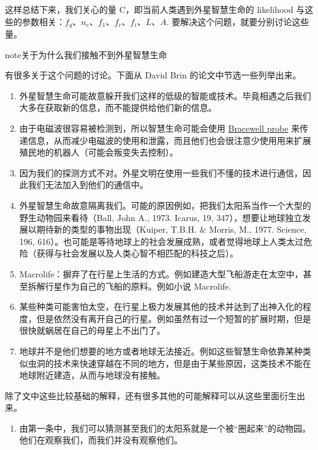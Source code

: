 \documentclass[letterpaper,10pt,english]{sphinxmanual}
\begin{document}
这样总结下来，我们关心的量 C，即当前人类遇到外星智慧生命的 likelihood 与这些的参数相关：\(f_g\)、\(n_e\)、\(f_1\)、\(f_c\)、\(f_i\)、\(L\)、\(A\). 要解决这个问题，就要分别讨论这些量。

\begin{notice}{note}{关于为什么我们接触不到外星智慧生命}

有很多关于这个问题的讨论。下面从 David Brin 的论文中节选一些列举出来。
\begin{enumerate}
\item {} 
外星智慧生命可能故意躲开我们这样的低级的智能或技术。毕竟相遇之后我们大多在获取新的信息，而不能提供给他们新的信息。

\item {} 
由于电磁波很容易被检测到，所以智慧生命可能会使用 \href{https://en.wikipedia.org/wiki/Bracewell\_probe}{Bracewell probe} 来传递信息，从而减少电磁波的使用和泄露，而且他们也会很注意少使用用来扩展殖民地的机器人（可能会叛变失去控制）。

\item {} 
因为我们的探测方式不对。外星文明在使用一些我们不懂的技术进行通信，因此我们无法加入到他们的通信中。

\item {} 
外星智慧生命故意隔离我们。可能的原因例如，把我们太阳系当作一个大型的野生动物园来看待（Ball, John A., 1973. Icarus, 19, 347），想要让地球独立发展以期待新的类型的事物出现（Kuiper, T.B.H. \& Morris, M., 1977. Science, 196, 616）。也可能是等待地球上的社会发展成熟，或者觉得地球上人类太过危险（获得与社会发展以及人类心智不相匹配的科技之后）。

\item {} 
Macrolife：摒弃了在行星上生活的方式。例如建造大型飞船游走在太空中，甚至拆解行星作为自己的飞船的原料。例如小说 Macrolife.

\item {} 
某些种类可能害怕太空，在行星上极力发展其他的技术并达到了出神入化的程度，但是依然没有离开自己的行星。例如虽然有过一个短暂的扩展时期，但是很快就蜗居在自己的母星上不出门了。

\item {} 
地球并不是他们想要的地方或者地球无法接近。例如这些智慧生命依靠某种类似虫洞的技术来快速穿越在不同的地方，但是由于某些原因，这类技术不能在地球附近建造，从而与地球没有接触。

\end{enumerate}

除了文中这些比较基础的解释，还有很多其他的可能解释可以从这些里面衍生出来。
\begin{enumerate}
\item {} 
由第一条中，我们可以猜测甚至我们的太阳系就是一个被“圈起来”的动物园。他们在观察我们，而我们并没有观察他们。


\end{enumerate}
\end{notice}
\end{document}
